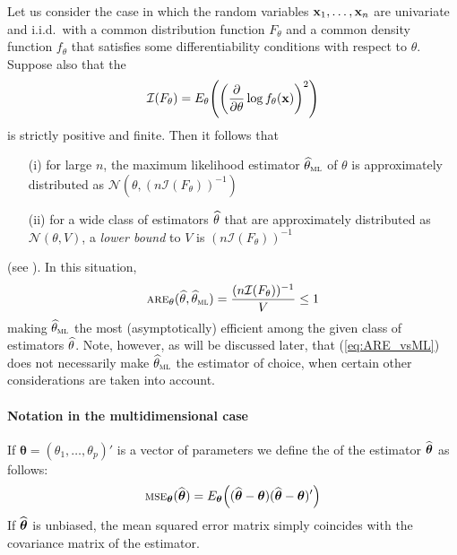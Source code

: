 Let us consider the case in which the random variables
$\mathbf x_1, \ldots, \mathbf x_n$ are univariate and i.i.d.\ with a common
distribution function $F_{\theta}$ and a common density function $f_{\theta}$
that satisfies some differentiability conditions with respect to $\theta$.
Suppose also that the \emph{}
\[
    \mathcal{I}\left(F_{\theta}\right) =
        E_{\theta}\left(\left(\frac{\partial}{\partial\theta}
        \log f_{\theta}(\stvec{x})\right)^2\right)
\] 
is strictly positive and finite. Then it follows that
\begin{enumerate}
    \item[(i)] for large $n$, the maximum likelihood estimator
    $\sthat{\theta}_{\stsc{ML}}$ of $\theta$ is approximately distributed as
    $\mathcal{N}\left(\theta, (n \mathcal{I}(F_{\theta}))^{-1}\right)$
    
    \item[(ii)] for a wide class of estimators $\widehat{\theta}$ that are
    approximately distributed as $\mathcal{N}(\theta, V)$, a \emph{lower
    bound} to $V$ is $(n \mathcal{I}(F_{\theta}))^{-1}$
\end{enumerate}
(see \citealp{LehmannCasella1988}). In this situation,
%
\begin{equation}\label{eq:ARE_vsML}
    \stsc{ARE}_{\theta}(\sthat{\theta}, \sthat{\theta}_{\stsc{ML}})
     = \frac{(n \mathcal{I}(F_{\theta}))^{-1}}{V} \leq 1
\end{equation}
%
making $\sthat{\theta}_{\stsc{ML}}$ the most (asymptotically) efficient among
the given class of estimators $\widehat{\theta}$. Note, however, as will be
discussed later, that (\ref{eq:ARE_vsML}) does not necessarily make
$\sthat{\theta}_{\stsc{ML}}$ the estimator of choice, when certain other
considerations are taken into account.


\paragraph{Notation in the multidimensional case}

If $\boldsymbol\theta = (\theta_1, \dots, \theta_p)'$ is a vector of parameters
we define the \emph{}
of the estimator $\widehat{\boldsymbol\theta}$ as follows:
\[
    \stsc{MSE}_{\boldsymbol\theta}(\sthat{\boldsymbol\theta})
    = E_{\boldsymbol\theta}\left((\sthat{\boldsymbol\theta} - \boldsymbol\theta)
                                 (\sthat{\boldsymbol\theta} - \boldsymbol\theta)'
                           \right)
\]
If $\widehat{\boldsymbol\theta}$ is unbiased, the mean squared error matrix simply
coincides with the covariance matrix of the estimator.

